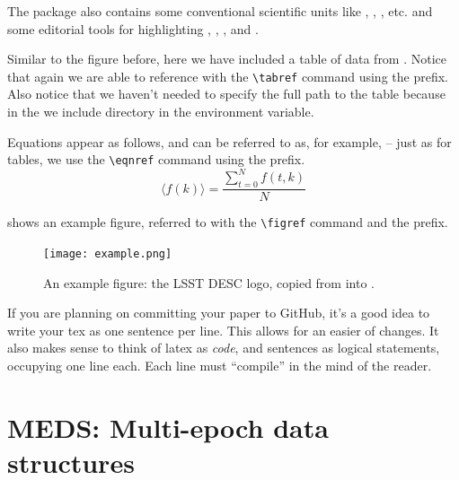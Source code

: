 \documentclass[\docopts]{\docclass}
\begin{document}
The  package also contains some conventional scientific units like \angstrom, \GeV, \Msun, etc. and some editorial tools for highlighting , , , and .


Similar to the figure before, here we have included a table of data from .
Notice that again we are able to reference  with the \verb=\tabref= command using the  prefix.
Also notice that we haven't needed to specify the full path to the table because in the  we include  directory in the  environment variable.



Equations appear as follows, and can be referred to as, for example,  -- just as for tables, we use the \verb=\eqnref= command using the  prefix.
\begin{equation}
  \label{eqn:example}
  \langle f(k) \rangle = \frac{ \sum_{t=0}^{N}f(t,k) }{N}
\end{equation}


 shows an example figure, referred to with the \verb=\figref= command and the  prefix.

\begin{figure}
\texttt{[image: example.png]}
\caption{An example figure: the LSST DESC logo, copied from  into . \label{fig:example}}
\end{figure}

If you are planning on committing your paper to GitHub, it's a good idea to write your tex as one sentence per line.
This allows for an easier  of changes.
It also makes sense to think of latex as \emph{code}, and sentences as logical statements, occupying one line each.
Each line must ``compile'' in the mind of the reader.


\section{MEDS: Multi-epoch data structures}

\end{document}
